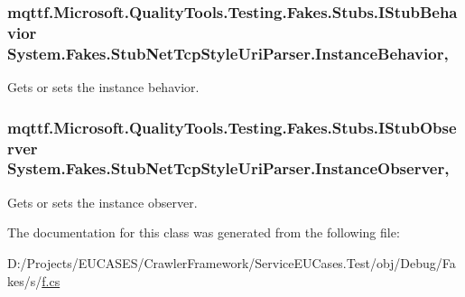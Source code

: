 \hypertarget{class_system_1_1_fakes_1_1_stub_net_tcp_style_uri_parser_aa1205385a9a0d88b396b0f5c817a42e8}{
\subsubsection[{Instance\-Behavior}]{\setlength{\rightskip}{0pt plus 5cm}mqttf.\-Microsoft.\-Quality\-Tools.\-Testing.\-Fakes.\-Stubs.\-I\-Stub\-Behavior System.\-Fakes.\-Stub\-Net\-Tcp\-Style\-Uri\-Parser.\-Instance\-Behavior\hspace{0.3cm}{\ttfamily [get]}, {\ttfamily [set]}}}\label{class_system_1_1_fakes_1_1_stub_net_tcp_style_uri_parser_aa1205385a9a0d88b396b0f5c817a42e8}


Gets or sets the instance behavior.

\hypertarget{class_system_1_1_fakes_1_1_stub_net_tcp_style_uri_parser_a6cc1740c6474710996c8c20bd59d3bf7}{
\subsubsection[{Instance\-Observer}]{\setlength{\rightskip}{0pt plus 5cm}mqttf.\-Microsoft.\-Quality\-Tools.\-Testing.\-Fakes.\-Stubs.\-I\-Stub\-Observer System.\-Fakes.\-Stub\-Net\-Tcp\-Style\-Uri\-Parser.\-Instance\-Observer\hspace{0.3cm}{\ttfamily [get]}, {\ttfamily [set]}}}\label{class_system_1_1_fakes_1_1_stub_net_tcp_style_uri_parser_a6cc1740c6474710996c8c20bd59d3bf7}


Gets or sets the instance observer.



The documentation for this class was generated from the following file\-:\begin{DoxyCompactItemize}
\item 
D\-:/\-Projects/\-E\-U\-C\-A\-S\-E\-S/\-Crawler\-Framework/\-Service\-E\-U\-Cases.\-Test/obj/\-Debug/\-Fakes/s/\hyperlink{s_2f_8cs}{f.\-cs}\end{DoxyCompactItemize}
